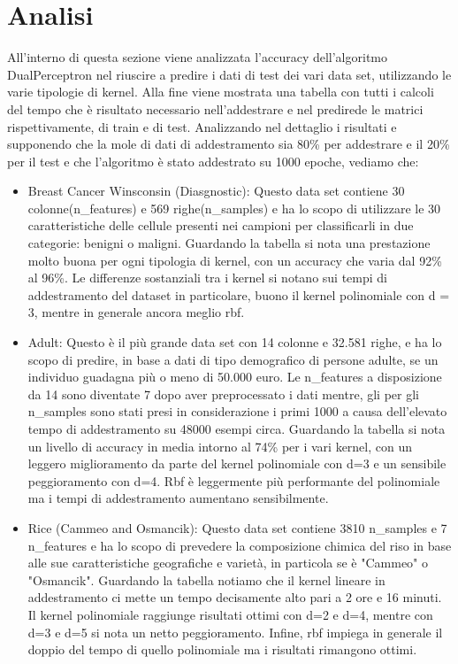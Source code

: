 \documentclass{article}
\begin{document}
	\section{Analisi}
	All'interno di questa sezione viene analizzata l'accuracy dell'algoritmo DualPerceptron nel riuscire a predire i dati di test dei vari data set, utilizzando le varie tipologie di kernel. Alla fine viene mostrata una tabella con tutti i calcoli del tempo che è risultato necessario nell'addestrare e nel predirede le matrici rispettivamente, di train e di test.  
	Analizzando nel dettaglio i risultati e supponendo che la mole di dati di addestramento sia 80\% per addestrare e il 20\% per il test e che l'algoritmo è stato addestrato su 1000 epoche, vediamo che:
	\begin{itemize}
		\item Breast Cancer Winsconsin (Diasgnostic): Questo data set contiene 30 colonne(n\_features) e 569 righe(n\_samples) e ha lo scopo di utilizzare le 30 caratteristiche delle cellule presenti nei campioni per classificarli in due categorie: benigni o maligni. Guardando la tabella si nota una prestazione molto buona per ogni tipologia di kernel, con un accuracy che varia dal 92\% al 96\%. Le differenze sostanziali tra i kernel si notano sui tempi di addestramento del dataset in particolare, buono il kernel polinomiale con d = 3, mentre in generale ancora meglio rbf. 
		\item Adult: Questo è il più grande data set con 14 colonne e 32.581 righe, e ha lo scopo di predire, in base a dati di tipo demografico di persone adulte, se un individuo guadagna più o meno di 50.000 euro. Le n\_features a disposizione da 14 sono diventate 7 dopo aver preprocessato i dati mentre, gli per gli n\_samples sono stati presi in considerazione i primi 1000 a causa dell'elevato tempo di addestramento su 48000 esempi circa. Guardando la tabella si nota un livello di accuracy in media intorno al 74\% per i vari kernel, con un leggero miglioramento da parte del kernel polinomiale con d=3 e un sensibile peggioramento con d=4. Rbf è leggermente più performante del polinomiale ma i tempi di addestramento aumentano sensibilmente.
		\item Rice (Cammeo and Osmancik): Questo data set contiene 3810 n\_samples e 7 n\_features e ha lo scopo di prevedere la composizione chimica del riso in base alle sue caratteristiche geografiche e varietà, in particola se è "Cammeo" o "Osmancik". Guardando la tabella notiamo che il kernel lineare in addestramento ci mette un tempo decisamente alto pari a 2 ore e 16 minuti. Il kernel polinomiale raggiunge risultati ottimi con d=2 e d=4, mentre con d=3 e d=5 si nota un netto peggioramento. Infine, rbf impiega in generale il doppio del tempo di quello polinomiale ma i risultati rimangono ottimi.

\end{itemize}
\end{document}
